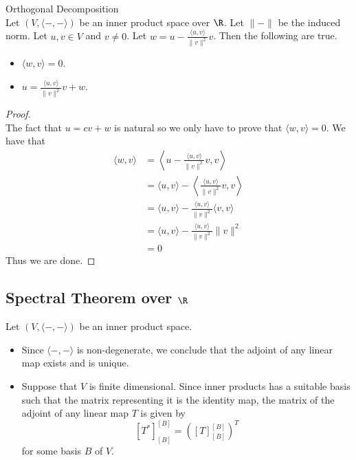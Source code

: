 \documentclass[a4paper]{article}
\begin{document}
\begin{thm}{Orthogonal Decomposition}{}\\
Let $(V,\langle-,-\rangle)$ be an inner product space over $\R$. Let $\|-\|$ be the induced norm. Let $u,v\in V$ and $v\neq 0$. Let $w=u-\frac{\langle u,v\rangle}{\|v\|^2}v$. Then the following are true. 
\begin{itemize}
\item $\langle w,v\rangle=0$. 
\item $u=\frac{\langle u,v\rangle}{\|v\|^2}v+w$. 
\end{itemize}
\begin{proof}\\
The fact that $u=cv+w$ is natural so we only have to prove that $\langle w,v\rangle=0$. We have that 
\begin{align*}
\langle w,v\rangle&=\left\langle u-\frac{\langle u,v\rangle}{\|v\|^2}v,v\right\rangle\\
&=\langle u,v\rangle-\left\langle \frac{\langle u,v\rangle}{\|v\|^2}v,v\right\rangle\\
&=\langle u,v\rangle-\frac{\langle u,v\rangle}{\|v\|^2}\langle v,v\rangle\\
&=\langle u,v\rangle-\frac{\langle u,v\rangle}{\|v\|^2}\|v\|^2\\
&=0
\end{align*}
Thus we are done. 
\end{proof}
\end{thm}

\subsection{Spectral Theorem over $\R$}
Let $(V,\langle-,-\rangle)$ be an inner product space. 
\begin{itemize}
\item Since $\langle-,-\rangle$ is non-degenerate, we conclude that the adjoint of any linear map exists and is unique. 
\item Suppose that $V$ is finite dimensional. Since inner products has a suitable basis such that the matrix representing it is the identity map, the matrix of the adjoint of any linear map $T$ is given by $$[T^\ast]_{[B]}^{[B]}=\left([T]_{[B]}^{[B]}\right)^T$$ for some basis $B$ of $V$. 
\end{itemize}
\end{document}
